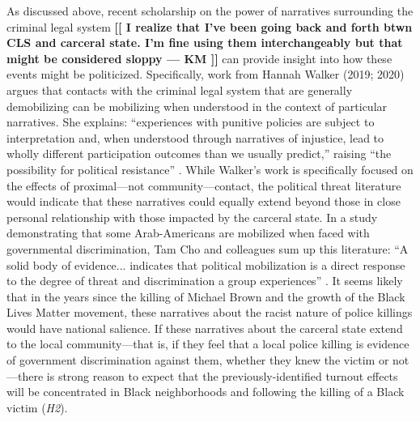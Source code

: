 \documentclass[12pt]{article}
\newcommand{\kmcomment}[1]{\textbf{\textcolor{JungleGreen}{[[ #1 --- KM ]]}}}
\begin{document}
As discussed above, recent scholarship on the power of narratives surrounding the criminal legal system \kmcomment{I realize that I've been going back and forth btwn CLS and carceral state. I'm fine using them interchangeably but that might be considered sloppy} can provide insight into how these events might be politicized. Specifically, work from Hannah Walker (2019; 2020) argues that contacts with the criminal legal system that are generally demobilizing can be mobilizing when understood in the context of particular narratives. She explains: ``experiences with punitive policies are subject to interpretation and, when understood through narratives of injustice, lead to wholly different participation outcomes than we usually predict,'' raising ``the possibility for political resistance'' \citep[][132-133]{walker2019targeted}. While Walker's work is specifically focused on the effects of proximal---not community---contact, the political threat literature would indicate that these narratives could equally extend beyond those in close personal relationship with those impacted by the carceral state. In a study demonstrating that some Arab-Americans are mobilized when faced with governmental discrimination, Tam Cho and colleagues sum up this literature: ``A solid body of evidence... indicates that political mobilization is a direct response to the degree of threat and discrimination a group experiences'' \citep[][978]{TamCho2006a}. It seems likely that in the years since the killing of Michael Brown and the growth of the Black Lives Matter movement, these narratives about the racist nature of police killings would have national salience. If these narratives about the carceral state extend to the local community---that is, if they feel that a local police killing is evidence of government discrimination against them, whether they knew the victim or not---there is strong reason to expect that the previously-identified turnout effects will be concentrated in Black neighborhoods and following the killing of a Black victim (\textit{H2}).
\end{document}
